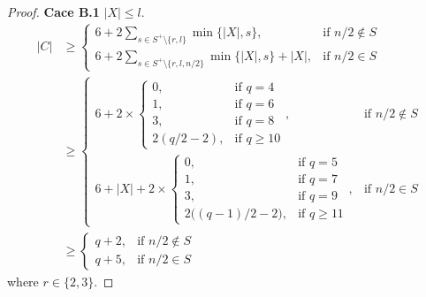 \documentclass[10pt,a4paper]{amsart}
\begin{document}
\begin{proof}
{\bf Cace B.1}  $|X|\le l$.
\begin{align}
|C| &\geq 
\begin{cases}
\displaystyle 6 + 2\sum_{s\in S^+\setminus\{r,l\}} \min\{|X|,s\}, & \text{if } n/2\notin S \\[4pt]
\displaystyle 6 + 2\sum_{s\in S^+\setminus\{r,l,n/2\}} \min\{|X|,s\}+ |X|, & \text{if } n/2\in S
\end{cases} \\
&\geq 
\begin{cases}
\displaystyle 6 + 2\times
\begin{cases}
0, & \text{if } q=4 \\
1, & \text{if } q=6 \\
3, & \text{if } q=8 \\
2(q/2-2), & \text{if } q\ge 10
\end{cases}, & \text{if } n/2\notin S \\[4pt]
\displaystyle 6+ |X| + 2\times
\begin{cases}
0, & \text{if } q=5 \\
1, & \text{if } q=7 \\
3, & \text{if } q=9 \\
2\big((q-1)/2-2\big), & \text{if } q\ge 11
\end{cases}, & \text{if } n/2\in S
\end{cases} \\
&\geq 
\begin{cases}
\displaystyle q+2, & \text{if } n/2\notin S \\[4pt]
\displaystyle q+5, & \text{if } n/2\in S
\end{cases}
\end{align}
where $r\in\{2,3\}$.


\end{proof}
\end{document}

